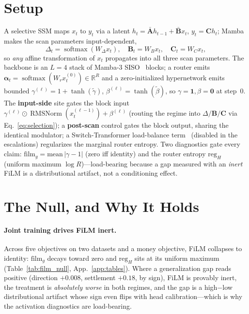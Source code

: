 \documentclass{article}
\newcommand{\R}{\mathbb{R}}
\DeclareMathOperator{\softmaxop}{softmax}
\newcommand{\softmax}{\softmaxop}
\DeclareMathOperator{\RMSNorm}{RMSNorm}
\begin{document}
\section{Setup}\label{sec:setup}

A selective SSM maps $x_t$ to $y_t$ via a latent
$h_t=\bar{\mathbf{A}}h_{t-1}+\bar{\mathbf{B}}x_t$, $y_t=\mathbf{C}h_t$; Mamba makes
the scan parameters input-dependent,
\begin{equation}\label{eq:selection}
\Delta_t=\softmax(W_\Delta x_t),\quad \mathbf{B}_t=W_B x_t,\quad \mathbf{C}_t=W_C x_t,
\end{equation}
so \emph{any} affine transformation of $x_t$ propagates into all three scan
parameters. The backbone is an $L{=}4$ stack of Mamba-3
SISO~\citep{lahoti2026mamba3} blocks; a router emits
$\bm{\alpha}_t=\softmax(W_r x_t^{(0)})\in\R^R$ and a zero-initialized hypernetwork
emits bounded $\gamma^{(\ell)}=1+\tanh(\tilde\gamma)$,
$\beta^{(\ell)}=\tanh(\tilde\beta)$, so $\gamma{=}\mathbf{1},\beta{=}\mathbf{0}$ at
step~0. The \textbf{input-side} site gates the block input
$\gamma^{(\ell)}\odot\RMSNorm(x_t^{(\ell-1)})+\beta^{(\ell)}$ (routing the regime
into $\Delta/\mathbf{B}/\mathbf{C}$ via Eq.~\eqref{eq:selection}); a
\textbf{post-scan} control gates the block output, sharing the identical modulator;
a Switch-Transformer load-balance term~\citep{fedus2022switch} (disabled in the
escalations) regularizes the marginal router entropy. Two diagnostics gate every
claim: $\mathrm{film}_g=\mathrm{mean}\,|\gamma-1|$ (zero iff identity) and the
router entropy $\mathrm{reg}_H$ (uniform maximum $\log R$)---load-bearing because a
gap measured with an \emph{inert} FiLM is a distributional artifact, not a
conditioning effect.

\section{The Null, and Why It Holds}\label{sec:null}

\paragraph{Joint training drives FiLM inert.}
Across five objectives on two datasets and a money objective, FiLM collapses to
identity: $\mathrm{film}_g$ decays toward zero and $\mathrm{reg}_H$ sits at its
uniform maximum (Table~\ref{tab:film_null}, App.~\ref{app:tables}). Where a
generalization gap reads positive (direction $+0.008$, settlement $+0.18$, by
sign), FiLM is provably inert, the treatment is \emph{absolutely worse} in both
regimes, and the gap is a high$-$low distributional artifact whose sign even flips
with head calibration---which is why the activation diagnostics are load-bearing.
\end{document}
